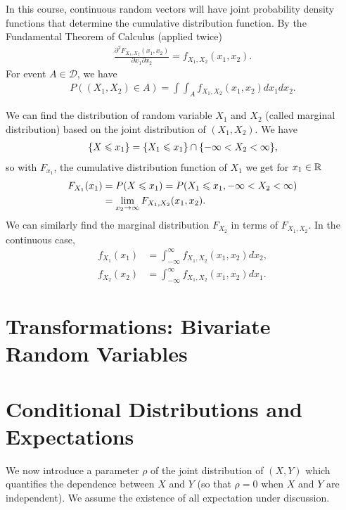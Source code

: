 \begin{remark}
    In this course, continuous random vectors will have joint probability
    density functions that determine the cumulative distribution function. By the
    Fundamental Theorem of Calculus (applied twice)
    \begin{align*}
        \frac{\partial^2 F_{X_1,X_2}(x_1,x_2)}{\partial x_1\partial x_2}=f_{X_1,X_2}(x_1,x_2).
    \end{align*}
    For event $A\in\mathcal{D}$, we have 
    \begin{align*}
        P((X_1,X_2)\in A)=\int\int_{A} f_{X_1,X_2}(x_1,x_2)dx_1dx_2.
    \end{align*}
\end{remark}



\begin{remark}
    We can find the distribution of random variable $X_1$ and $X_2$ 
    (called marginal distribution) based on the joint distribution of $(X_1,X_2)$.
    We have
    \begin{align*}
        \{X\leqslant x_1\} = \{X_1\leqslant x_1\}\cap \{-\infty<X_2<\infty\},
    \end{align*}
    so with $F_{x_1}$, the cumulative distribution function of $X_1$ we get for $x_1\in\mathbb{R}$
    \begin{align*}
        F_{X_1}(x_1) &= P(X\leqslant x_1)=P(X_1\leqslant x_1,-\infty<X_2<\infty)\\
                    &= \lim_{x_2\rightarrow \infty} F_{X_1,X_2}(x_1,x_2).
    \end{align*}
    We can similarly find the marginal distribution $F_{X_2}$ in terms of $F_{X_1,X_2}$.
    In the continuous case,
    \begin{align*}
        f_{X_1}(x_1)&=\int_{-\infty}^{\infty} f_{X_1,X_2}(x_1,x_2)dx_2,\\
        f_{X_2}(x_2)&=\int_{-\infty}^{\infty} f_{X_1,X_2}(x_1,x_2)dx_1.
    \end{align*}
\end{remark}


\section{Transformations: Bivariate Random Variables}

\section{Conditional Distributions and Expectations}
We now introduce a parameter $\rho$ of the joint distribution of $(X,Y)$ 
which quantifies the dependence between $X$ and $Y$ (so that $\rho=0$ when $X$ and $Y$ are independent).
We assume the existence of all expectation under discussion.

